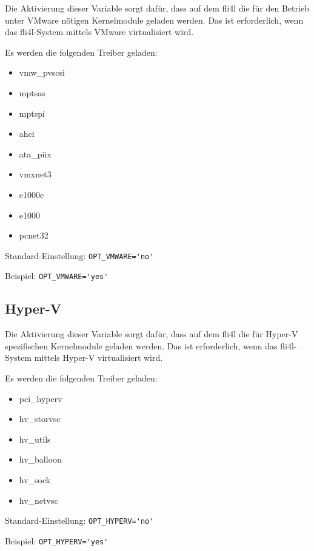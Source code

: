 \begin{description}

Die Aktivierung dieser Variable sorgt dafür, dass auf dem fli4l die für
den Betrieb unter VMware nötigen Kernelmodule geladen werden. Das ist
erforderlich, wenn das fli4l-System mittels VMware virtualisiert wird.

Es werden die folgenden Treiber geladen:

\begin{itemize}
   \item vmw\_pvscsi
   \item mptsas
   \item mptspi
   \item ahci
   \item ata\_piix
   \item vmxnet3
   \item e1000e
   \item e1000
   \item pcnet32
\end{itemize}

Standard-Einstellung: \verb+OPT_VMWARE='no'+

Beispiel: \verb+OPT_VMWARE='yes'+

\end{description}

\subsection {Hyper-V}

\begin{description}

Die Aktivierung dieser Variable sorgt dafür, dass auf dem fli4l die für
Hyper-V spezifischen Kernelmodule geladen werden. Das ist erforderlich,
wenn das fli4l-System mittels Hyper-V virtualisiert wird.

Es werden die folgenden Treiber geladen:

\begin{itemize}
    \item pci\_hyperv
    \item hv\_storvsc
    \item hv\_utils
    \item hv\_balloon
    \item hv\_sock
    \item hv\_netvsc
\end{itemize}

Standard-Einstellung: \verb+OPT_HYPERV='no'+

Beispiel: \verb+OPT_HYPERV='yes'+

\end{description}
